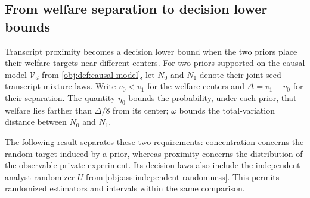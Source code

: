 \subsection{From welfare separation to decision lower bounds}

Transcript proximity becomes a decision lower bound when the two priors place their welfare targets near different centers. For two priors supported on the causal model \(\mathcal V_d\) from \cref{obj:def:causal-model}, let \(N_0\) and \(N_1\) denote their joint seed-transcript mixture laws. Write \(v_0<v_1\) for the welfare centers and \(\Delta=v_1-v_0\) for their separation. The quantity \(\eta_0\) bounds the probability, under each prior, that welfare lies farther than \(\Delta/8\) from its center; \(\omega\) bounds the total-variation distance between \(N_0\) and \(N_1\).

The following result separates these two requirements: concentration concerns the random target induced by a prior, whereas proximity concerns the distribution of the observable private experiment. Its decision laws also include the independent analyst randomizer \(U\) from \cref{obj:ass:independent-randomness}. This permits randomized estimators and intervals within the same comparison.

